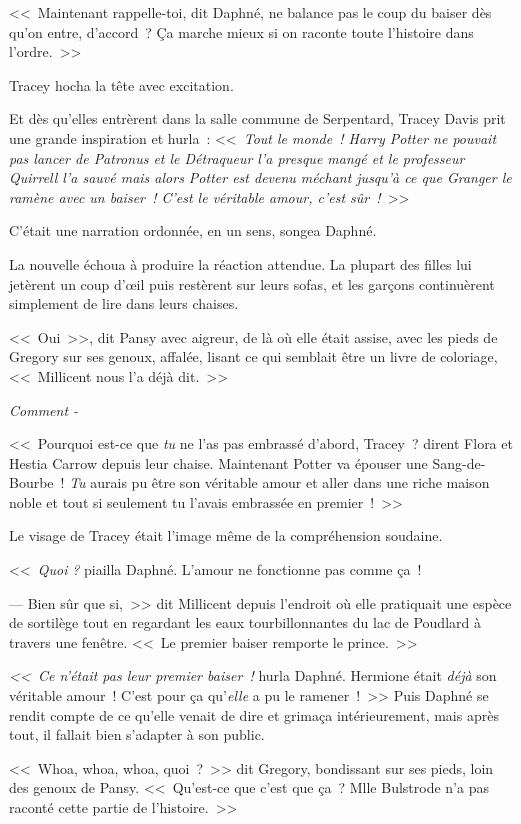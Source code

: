 <<~Maintenant rappelle-toi, dit Daphné, ne balance pas le coup du baiser dès qu'on entre, d'accord~? Ça marche mieux si on raconte toute l'histoire dans l'ordre.~>>

Tracey hocha la tête avec excitation.

Et dès qu'elles entrèrent dans la salle commune de Serpentard, Tracey Davis prit une grande inspiration et hurla~: <<~\emph{Tout le monde~! Harry Potter ne pouvait pas lancer de Patronus et le Détraqueur l'a presque mangé et le professeur Quirrell l'a sauvé mais alors Potter est devenu méchant jusqu'à ce que Granger le ramène avec un baiser~! C'est le véritable amour, c'est sûr~!}~>>

C'était une narration ordonnée, en un sens, songea Daphné.

La nouvelle échoua à produire la réaction attendue. La plupart des filles lui jetèrent un coup d'œil puis restèrent sur leurs sofas, et les garçons continuèrent simplement de lire dans leurs chaises.

<<~Oui~>>, dit Pansy avec aigreur, de là où elle était assise, avec les pieds de Gregory sur ses genoux, affalée, lisant ce qui semblait être un livre de coloriage, <<~Millicent nous l'a déjà dit.~>>

\emph{Comment -}

<<~Pourquoi est-ce que \emph{tu} ne l'as pas embrassé d'abord, Tracey~? dirent Flora et Hestia Carrow depuis leur chaise. Maintenant Potter va épouser une Sang-de-Bourbe~! \emph{Tu} aurais pu être son véritable amour et aller dans une riche maison noble et tout si seulement tu l'avais embrassée en premier~!~>>

Le visage de Tracey était l'image même de la compréhension soudaine.

<<~\emph{Quoi} \emph{?} piailla Daphné. L'amour ne fonctionne pas comme ça~!

--- Bien sûr que si,~>> dit Millicent depuis l'endroit où elle pratiquait une espèce de sortilège tout en regardant les eaux tourbillonnantes du lac de Poudlard à travers une fenêtre. <<~Le premier baiser remporte le prince.~>>

\emph{<<~Ce n'était pas leur premier baiser~!} hurla Daphné. Hermione était \emph{déjà} son véritable amour~! C'est pour ça qu'\emph{elle} a pu le ramener~!~>> Puis Daphné se rendit compte de ce qu'elle venait de dire et grimaça intérieurement, mais après tout, il fallait bien s'adapter à son public.

<<~Whoa, whoa, whoa, quoi~?~>> dit Gregory, bondissant sur ses pieds, loin des genoux de Pansy. <<~Qu'est-ce que c'est que ça~? Mlle Bulstrode n'a pas raconté cette partie de l'histoire.~>>

